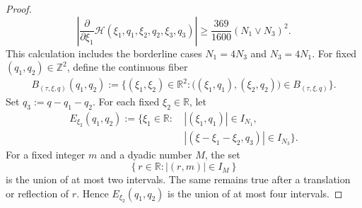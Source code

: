 \documentclass[12pt,oneside,reqno]{amsart}
\numberwithin{equation}{section}
\theoremstyle{plain}
\def\R{{\mathbb R}}
\def\Z{{\mathbb Z}}
\newcommand{\abs}[1]{%
    \left|#1\right|%
}
\newcommand{\brs}[1]{%
    \left\{#1\right\}
}
\def\pt{\partial}
\begin{document}
\begin{proof}
\begin{equation}
\label{eq:resonance-xi1-lower-bound}
    \left|
        \frac{\pt}{\pt\xi_1}
        \mathcal H(
            \xi_1,q_1,
            \xi_2,q_2,
            \xi_3,q_3
        )
    \right|
    \geq
    \frac{369}{1600}(N_1\vee N_3)^2.
\end{equation}
This calculation includes the borderline cases $N_1=4N_3$ and
$N_3=4N_1$.
For fixed $(q_1,q_2)\in\Z^2$, define the continuous fiber
\begin{equation}
\begin{aligned}
B_{(\tau,\xi,q)}(q_1,q_2)
:=
\Big\{
(\xi_1,\xi_2)\in\R^2:
\big((\xi_1,q_1),(\xi_2,q_2)\big)
\in B_{(\tau,\xi,q)}
\Big\}.
\end{aligned}
\end{equation}
Set $q_3:=q-q_1-q_2$. For each fixed $\xi_2\in\R$, let
\begin{equation}
\begin{aligned}
E_{\xi_2}(q_1,q_2)
:=
\Big\{
\xi_1\in\R:
&\ \abs{(\xi_1,q_1)}\in I_{N_1},
\\
&\ \abs{(\xi-\xi_1-\xi_2,q_3)}\in I_{N_3}
\Big\}.
\end{aligned}
\end{equation}
For a fixed integer $m$ and a dyadic number $M$, the set
\begin{equation*}
    \brs{r\in\R:\abs{(r,m)}\in I_M}
\end{equation*}
is the union of at most two intervals. The same remains true after a
translation or reflection of $r$. Hence $E_{\xi_2}(q_1,q_2)$ is the union
of at most four intervals.


\end{proof}
\end{document}

